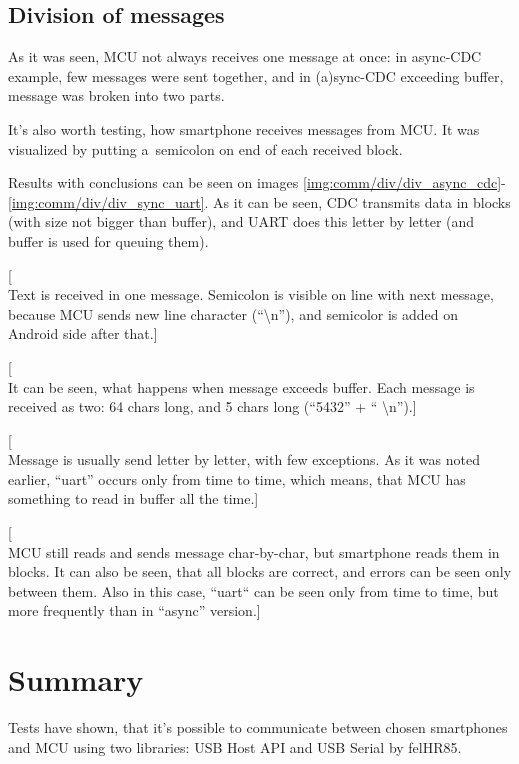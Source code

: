 \clearpage

\subsection{Division of messages}
As it was seen, MCU not always receives one message at once:
in async-CDC example, few messages were sent together, and in (a)sync-CDC
exceeding buffer, message was broken into two parts.

It's also worth testing, how smartphone receives messages from MCU.
It was visualized by putting a~semicolon on end of each received block.

Results with conclusions can be seen on images
\ref{img:comm/div/div_async_cdc}-\ref{img:comm/div/div_sync_uart}.
As it can be seen, CDC transmits data in blocks (with size not bigger than
buffer), and UART does this letter by letter (and buffer is used for queuing
them).

[\\Text is received in one message. 
Semicolon is visible on line with next message, because MCU sends new line
character (``\textbackslash n''), and semicolor is added on Android side after that.]

[\\It can be seen, what happens when message exceeds buffer.
Each message is received as two:
64 chars long, and 5 chars long (``5432'' + `` \textbackslash n'').]

[\\Message is usually send letter by letter, with few exceptions.
As it was noted earlier, ``uart'' occurs only from time to time, which means,
that MCU has something to read in buffer all the time.]

[\\MCU still reads and sends message char-by-char, but smartphone reads them in
blocks. 
It can also be seen, that all blocks are correct, and errors can be
seen only between them. 
Also in this case, ``uart`` can be seen only from time to time, but more
frequently than in ``async'' version.]


\clearpage

\section{Summary}
Tests have shown, that it's possible to communicate between chosen smartphones
and MCU using two libraries: USB Host API and USB Serial by felHR85.

